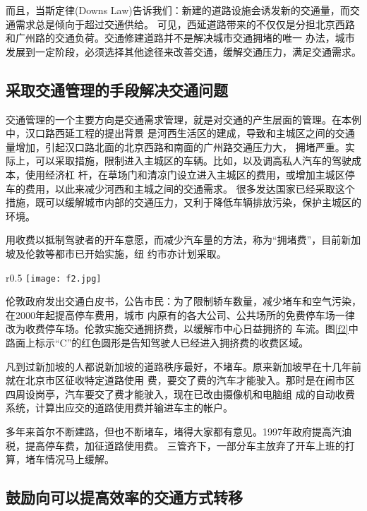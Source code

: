﻿\documentclass[11pt,a4paper,onecolumn]{article}
\begin{document}
而且，当斯定律(Downs Law)告诉我们：新建的道路设施会诱发新的交通量，而交通需求总是倾向于超过交通供给。
可见，西延道路带来的不仅仅是分担北京西路和广州路的交通负荷。交通修建道路并不是解决城市交通拥堵的唯一
办法，城市发展到一定阶段，必须选择其他途径来改善交通，缓解交通压力，满足交通需求。

\subsection{采取交通管理的手段解决交通问题}

交通管理的一个主要方向是交通需求管理，就是对交通的产生层面的管理。在本例中，汉口路西延工程的提出背景
是河西生活区的建成，导致和主城区之间的交通量增加，引起汉口路北面的北京西路和南面的广州路交通压力大，
拥堵严重。实际上，可以采取措施，限制进入主城区的车辆。比如，以及调高私人汽车的驾驶成本，使用经济杠
杆，在草场门和清凉门设立进入主城区的费用，或增加主城区停车的费用，以此来减少河西和主城之间的交通需求。
很多发达国家已经采取这个措施，既可以缓解城市内部的交通压力，又利于降低车辆排放污染，保护主城区的环境。

用收费以抵制驾驶者的开车意愿，而减少汽车量的方法，称为“拥堵费”，目前新加坡及伦敦等都市已开始实施，纽
约市亦计划采取。

\begin{wrapfigure}{r}{0.5\textwidth}
\vspace{-2ex}
\texttt{[image: f2.jpg]}
\caption{伦敦市拥堵收费示意图}
\label{f2}
\vspace{-2ex}
\end{wrapfigure}

伦敦政府发出交通白皮书，公告市民：为了限制轿车数量，减少堵车和空气污染，在2000年起提高停车费用，城市
内原有的各大公司、公共场所的免费停车场一律改为收费停车场。伦敦实施交通拥挤费，以缓解市中心日益拥挤的
车流。图\ref*{f2}中路面上标示“C”的红色圆形是告知驾驶人已经进入拥挤费的收费区域。

凡到过新加坡的人都说新加坡的道路秩序最好，不堵车。原来新加坡早在十几年前就在北京市区征收特定道路使用
费，要交了费的汽车才能驶入。那时是在闹市区四周设岗亭，汽车要交了费才能驶入，现在已改由摄像机和电脑组
成的自动收费系统，计算出应交的道路使用费并输进车主的帐户。

多年来首尔不断建路，但也不断堵车，堵得大家都有意见。1997年政府提高汽油税，提高停车费，加征道路使用费。
三管齐下，一部分车主放弃了开车上班的打算，堵车情况马上缓解。


\subsection{鼓励向可以提高效率的交通方式转移}
\end{document}
